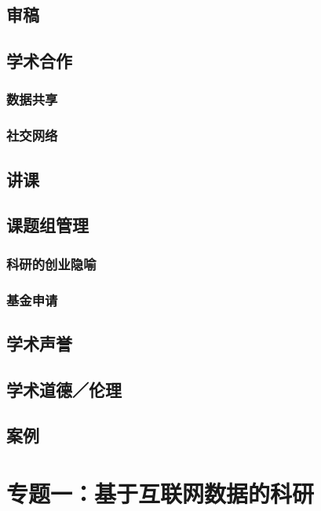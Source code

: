 \documentclass[]{book}
\begin{document}
\section{审稿}

\section{学术合作}

\subsection{数据共享}

\subsection{社交网络}

\section{讲课}

\section{课题组管理}

\subsection{科研的创业隐喻}

\subsection{基金申请}

\section{学术声誉}

\section{学术道德／伦理}

\section{案例}

\chapter{专题一：基于互联网数据的科研}
\end{document}
